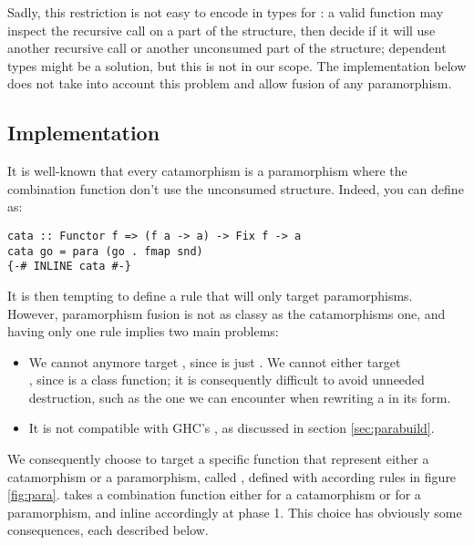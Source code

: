 Sadly, this restriction is not easy to encode in types for : a valid function may inspect the recursive call on a part of the structure, then decide if it will use another recursive call or another unconsumed part of the structure; dependent types might be a solution, but this is not in our scope. The implementation below does not take into account this problem and allow fusion of any paramorphism.

\subsection{Implementation}
\label{sec:para-impl}

It is well-known that every catamorphism is a paramorphism where the combination function don't use the unconsumed structure. Indeed, you can define  as:
\begin{verbatim}
cata :: Functor f => (f a -> a) -> Fix f -> a
cata go = para (go . fmap snd)
{-# INLINE cata #-}
\end{verbatim}

\noindent It is then tempting to define a rule that will only target paramorphisms. However, paramorphism fusion is not as classy as the catamorphisms one, and having only one rule implies two main problems:
\begin{itemize}
\item We cannot anymore target , since  is just . We cannot either target\\ , since  is a class function; it is consequently difficult to avoid unneeded destruction, such as the one we can encounter when rewriting a  in its  form.

\item It is not compatible with GHC's , as discussed in section \ref{sec:parabuild}.
\end{itemize}

We consequently choose to target a specific function that represent either a catamorphism or a paramorphism, called , defined with according rules in figure \ref{fig:para}.  takes a combination function either for a catamorphism or for a paramorphism, and inline accordingly at phase 1.
This choice has obviously some consequences, each described below.

